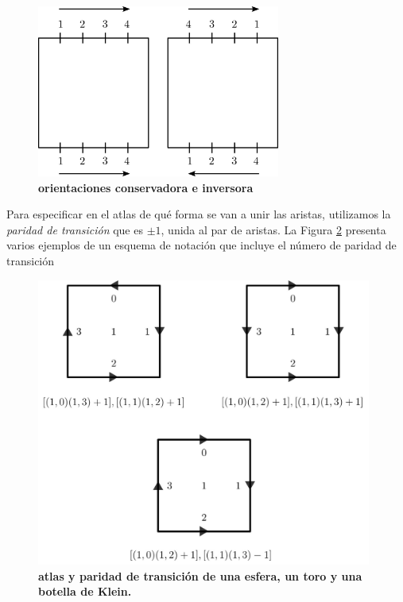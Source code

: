\begin{figure}[h]
\includegraphics[width=8cm]{Img/GEO/geo-atlas1.jpg}
\centering
\caption{\textbf{\footnotesize{orientaciones conservadora e inversora}}}
\label{fig:atlas0}
\end{figure}

Para especificar en el atlas de qué forma se van a unir las aristas, utilizamos la \textit{paridad de transición} que es $\pm 1$, unida al par de aristas. La Figura \ref{fig:atlas1} presenta varios ejemplos de un esquema de notación que incluye el número de paridad de transición

\begin{figure}[h]
\includegraphics[width=11cm]{Img/GEO/geo-atlas2.jpg}
\centering
\caption{\textbf{\footnotesize{atlas y paridad de transición de una esfera, un toro y una botella de Klein.}}}
\label{fig:atlas1}
\end{figure}


